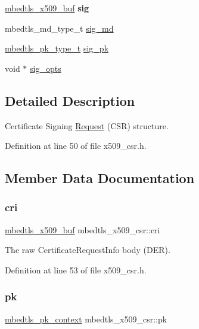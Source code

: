 \begin{DoxyCompactItemize}
\mbox{\hyperlink{group__x509__module_ga4d02c9e8e4e2934555e0d132cd2976dc}{mbedtls\+\_\+x509\+\_\+buf}} {\bfseries sig}
\item 
mbedtls\+\_\+md\+\_\+type\+\_\+t \mbox{\hyperlink{structmbedtls__x509__csr_afaf345aa794cfd4b5056ce49a67bb611}{sig\+\_\+md}}
\item 
\mbox{\hyperlink{pk_8h_a3fe41eff5605ae727eb9d28dad297020}{mbedtls\+\_\+pk\+\_\+type\+\_\+t}} \mbox{\hyperlink{structmbedtls__x509__csr_a670fac5f5b5cd7398e1b241dc257bc97}{sig\+\_\+pk}}
\item 
void $\ast$ \mbox{\hyperlink{structmbedtls__x509__csr_ac1152e686c27158c211b2c3fdfaefdb7}{sig\+\_\+opts}}
\end{DoxyCompactItemize}


\subsection{Detailed Description}
Certificate Signing \mbox{\hyperlink{struct_request}{Request}} (C\+SR) structure. 

Definition at line 50 of file x509\+\_\+csr.\+h.



\subsection{Member Data Documentation}
\mbox{\label{structmbedtls__x509__csr_a6adcb10c37a6bc946310d54567468f8a}} 
\subsubsection{\texorpdfstring{cri}{cri}}
{\footnotesize\ttfamily \mbox{\hyperlink{group__x509__module_ga4d02c9e8e4e2934555e0d132cd2976dc}{mbedtls\+\_\+x509\+\_\+buf}} mbedtls\+\_\+x509\+\_\+csr\+::cri}

The raw Certificate\+Request\+Info body (D\+ER). 

Definition at line 53 of file x509\+\_\+csr.\+h.

\mbox{\label{structmbedtls__x509__csr_abacfec387e945f59a35a106eebba0a1c}} 
\subsubsection{\texorpdfstring{pk}{pk}}
{\footnotesize\ttfamily \mbox{\hyperlink{structmbedtls__pk__context}{mbedtls\+\_\+pk\+\_\+context}} mbedtls\+\_\+x509\+\_\+csr\+::pk}

